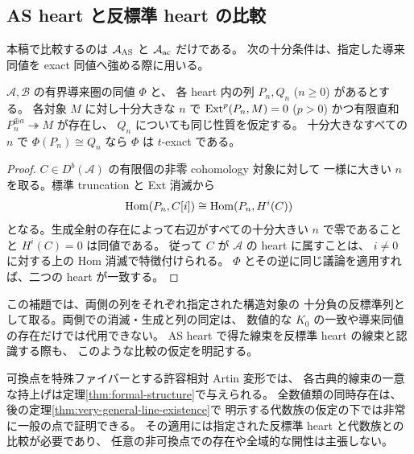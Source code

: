 \subsection{AS heart と反標準 heart の比較}
本稿で比較するのは $\mathcal A_{\rm AS}$ と $\mathcal A_{\rm ac}$ だけである。
次の十分条件は、指定した導来同値を exact 同値へ強める際に用いる。
\begin{lemma}\label{lem:ample-heart-transfer}
$\mathcal A,\mathcal B$ の有界導来圏の同値 $\Phi$ と、
各 heart 内の列 $P_n,Q_n$ ($n\ge0$) があるとする。
各対象 $M$ に対し十分大きな $n$ で
$\operatorname{Ext}^{p}(P_n,M)=0$ ($p>0$) かつ有限直和 $P_n^{\oplus a}\twoheadrightarrow M$ が存在し、
$Q_n$ についても同じ性質を仮定する。
十分大きなすべての $n$ で $\Phi(P_n)\cong Q_n$ なら $\Phi$ は $t$-exact である。
\end{lemma}
\begin{proof}
$C\in D^b(\mathcal A)$ の有限個の非零 cohomology 対象に対して
一様に大きい $n$ を取る。標準 truncation と Ext 消滅から
\[
 \operatorname{Hom}(P_n,C[i])\cong\operatorname{Hom}(P_n,H^i(C))
\]
となる。生成全射の存在によって右辺がすべての十分大きい $n$ で零であることと
$H^i(C)=0$ は同値である。
従って $C$ が $\mathcal A$ の heart に属すことは、
$i\ne0$ に対する上の Hom 消滅で特徴付けられる。
$\Phi$ とその逆に同じ議論を適用すれば、二つの heart が一致する。
\end{proof}


この補題では、両側の列をそれぞれ指定された構造対象の
十分負の反標準列として取る。両側での消滅・生成と列の同定は、
数値的な $K_0$ の一致や導来同値の存在だけでは代用できない。
AS heart で得た線束を反標準 heart の線束と認識する際も、
このような比較の仮定を明記する。

可換点を特殊ファイバーとする許容相対 Artin 変形では、
各古典的線束の一意な持上げは定理\ref{thm:formal-structure}で与えられる。
全数値類の同時存在は、後の定理\ref{thm:very-general-line-existence}で
明示する代数族の仮定の下では非常に一般の点で証明できる。
その適用には指定された反標準 heart と代数族との比較が必要であり、
任意の非可換点での存在や全域的な開性は主張しない。
